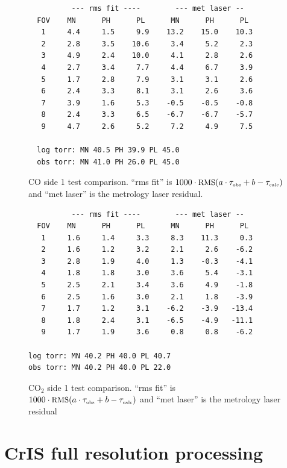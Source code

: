 \documentclass[12pt]{article}
\begin{document}
\begin{figure}
\begin{verbatim}
          --- rms fit ----        --- met laser --
  FOV    MN      PH      PL      MN      PH      PL  
   1     4.4     1.5     9.9    13.2    15.0    10.3
   2     2.8     3.5    10.6     3.4     5.2     2.3
   3     4.9     2.4    10.0     4.1     2.8     2.6
   4     2.7     3.4     7.7     4.4     6.7     3.9
   5     1.7     2.8     7.9     3.1     3.1     2.6
   6     2.4     3.3     8.1     3.1     2.6     3.6
   7     3.9     1.6     5.3    -0.5    -0.5    -0.8
   8     2.4     3.3     6.5    -6.7    -6.7    -5.7
   9     4.7     2.6     5.2     7.2     4.9     7.5

  log torr: MN 40.5 PH 39.9 PL 45.0
  obs torr: MN 41.0 PH 26.0 PL 45.0
\end{verbatim}
\caption{CO side 1 test comparison.  ``rms fit'' is $1000 \cdot
  \mbox{\small RMS}(a\cdot\tau_{\mbox{\tiny obs}} + b - \tau_{\mbox{\tiny calc}})$ and ``met laser'' is the
  metrology laser residual.}
\end{figure}


\begin{figure}
\begin{verbatim}
          --- rms fit ----        --- met laser --
  FOV    MN      PH      PL      MN      PH      PL  
   1     1.6     1.4     3.3     8.3    11.3     0.3
   2     1.6     1.2     3.2     2.1     2.6    -6.2
   3     2.8     1.9     4.0     1.3    -0.3    -4.1
   4     1.8     1.8     3.0     3.6     5.4    -3.1
   5     2.5     2.1     3.4     3.6     4.9    -1.8
   6     2.5     1.6     3.0     2.1     1.8    -3.9
   7     1.7     1.2     3.1    -6.2    -3.9   -13.4
   8     1.8     2.4     3.1    -6.5    -4.9   -11.1
   9     1.7     1.9     3.6     0.8     0.8    -6.2

log torr: MN 40.2 PH 40.0 PL 40.7
obs torr: MN 40.2 PH 40.0 PL 22.0
\end{verbatim}
\caption{CO$_2$ side 1 test comparison.  ``rms fit'' is $1000 \cdot
    \mbox{\small RMS}(a\cdot\tau_{\mbox{\tiny obs}} + b - \tau_{\mbox{\tiny calc}})$ and ``met laser'' is the
    metrology laser residual}
\end{figure}

\FloatBarrier

\section{CrIS full resolution processing}
\end{document}
